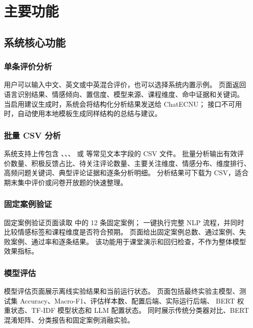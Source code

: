 \section{主要功能}

\subsection{系统核心功能}

\subsubsection{单条评价分析}

用户可以输入中文、英文或中英混合评价，也可以选择系统内置示例。
页面返回语言识别结果、情感倾向、置信度、模型来源、课程维度、命中证据和关键词。
当启用建议生成时，系统会将结构化分析结果发送给 ChatECNU；
接口不可用时，自动使用本地模板生成同样结构的总结与建议。

\subsubsection{批量 CSV 分析}

系统支持上传包含 、、、 或
 等常见文本字段的 CSV 文件。
批量分析输出有效评价数量、积极反馈占比、待关注评论数量、主要关注维度、情感分布、维度排行、
高频问题关键词、典型评论证据和逐条分析明细。
分析结果可下载为 CSV，适合期末集中评价或问卷开放题的快速整理。

\subsubsection{固定案例验证}

固定案例验证页面读取  中的 12 条固定案例；
一键执行完整 NLP 流程，并同时比较情感标签和课程维度是否符合预期。
页面给出固定案例总数、通过案例、失败案例、通过率和逐条结果。
该功能用于课堂演示和回归检查，不作为整体模型效果指标。

\subsubsection{模型评估}

模型评估页面展示离线实验结果和当前运行状态。
页面包括最终实验主模型、测试集 Accuracy、Macro-F1、评估样本数、配置后端、实际运行后端、
BERT 权重状态、TF-IDF 模型状态和 LLM 配置状态。
同时展示传统分类器对比、BERT 混淆矩阵、分类报告和固定案例消融实验。

